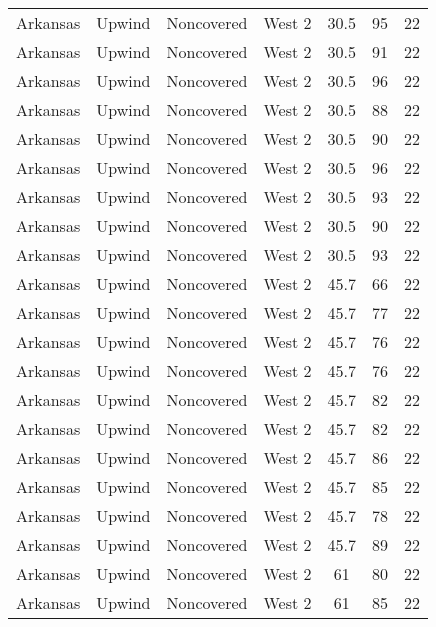 \documentclass{article}
\begin{document}
\begin{longtable}[H]{ccccccc}
Arkansas & Upwind    & Noncovered & West 2        & 30.5         & 95          & 22  \\
Arkansas & Upwind    & Noncovered & West 2        & 30.5         & 91          & 22  \\
Arkansas & Upwind    & Noncovered & West 2        & 30.5         & 96          & 22  \\
Arkansas & Upwind    & Noncovered & West 2        & 30.5         & 88          & 22  \\
Arkansas & Upwind    & Noncovered & West 2        & 30.5         & 90          & 22  \\
Arkansas & Upwind    & Noncovered & West 2        & 30.5         & 96          & 22  \\
Arkansas & Upwind    & Noncovered & West 2        & 30.5         & 93          & 22  \\
Arkansas & Upwind    & Noncovered & West 2        & 30.5         & 90          & 22  \\
Arkansas & Upwind    & Noncovered & West 2        & 30.5         & 93          & 22  \\
Arkansas & Upwind    & Noncovered & West 2        & 45.7         & 66          & 22  \\
Arkansas & Upwind    & Noncovered & West 2        & 45.7         & 77          & 22  \\
Arkansas & Upwind    & Noncovered & West 2        & 45.7         & 76          & 22  \\
Arkansas & Upwind    & Noncovered & West 2        & 45.7         & 76          & 22  \\
Arkansas & Upwind    & Noncovered & West 2        & 45.7         & 82          & 22  \\
Arkansas & Upwind    & Noncovered & West 2        & 45.7         & 82          & 22  \\
Arkansas & Upwind    & Noncovered & West 2        & 45.7         & 86          & 22  \\
Arkansas & Upwind    & Noncovered & West 2        & 45.7         & 85          & 22  \\
Arkansas & Upwind    & Noncovered & West 2        & 45.7         & 78          & 22  \\
Arkansas & Upwind    & Noncovered & West 2        & 45.7         & 89          & 22  \\
Arkansas & Upwind    & Noncovered & West 2        & 61           & 80          & 22  \\
Arkansas & Upwind    & Noncovered & West 2        & 61           & 85          & 22  \\

\end{longtable}
\end{document}
